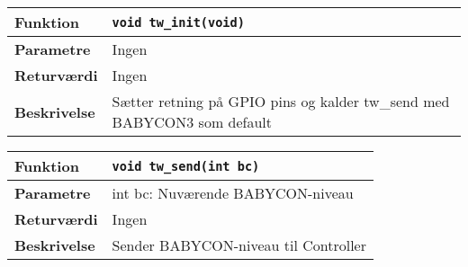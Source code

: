 \begin{center}
    \begin{tabular}{ | l | p{} |}
    \hline
    \textbf{Funktion}	& \verb+void tw_init(void) +						\\ \hline
    \textbf{Parametre} 	& Ingen			\\ \hline
    \textbf{Returværdi}	& Ingen	 								\\ \hline
    \textbf{Beskrivelse}& Sætter retning på GPIO pins og kalder tw\_send med BABYCON3 som default		\\ \hline
    \end{tabular}
\end{center}

\begin{center}
    \begin{tabular}{ | l | p{} |}
    \hline
    \textbf{Funktion}	& \verb+void tw_send(int bc) +						\\ \hline
    \textbf{Parametre} 	& int bc: Nuværende BABYCON-niveau			\\ \hline
    \textbf{Returværdi}	& Ingen	 								\\ \hline
    \textbf{Beskrivelse}& Sender BABYCON-niveau til Controller		\\ \hline
    \end{tabular}
\end{center}


